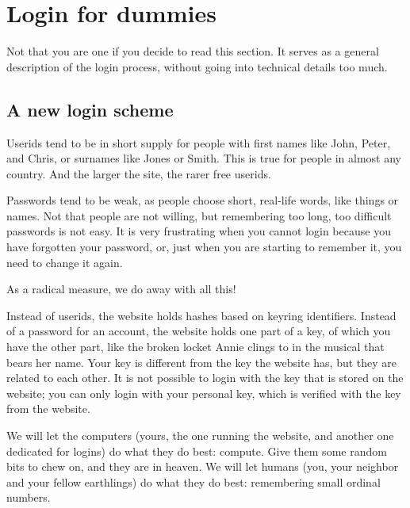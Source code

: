 \section{Login for dummies}
Not that you are one if you decide to read this section.
It serves as a general description of the login process,
without going into technical details too much.

\subsection{A new login scheme}
Userids tend to be in short supply for people with first names like John, Peter, and Chris,
or surnames like Jones or Smith.
This is true for people in almost any country.
And the larger the site, the rarer free userids.
\par
Passwords tend to be weak,
as people choose short, real-life words, like things or names.
Not that people are not willing, but remembering too long, too difficult passwords is not easy.
It is very frustrating when you cannot login because you have forgotten your password,
or,
just when you are starting to remember it,
you need to change it again.
\par
As a radical measure, we do away with all this!
\par
Instead of userids, the website holds hashes based on keyring identifiers.
Instead of a password for an account, the website holds one part of a key, of which you have the other part,
like the broken locket Annie clings to in the musical that bears her name.
Your key is different from the key the website has, but they are related to each other.
It is not possible to login with the key that is stored on the website;
you can only login with your personal key, which is verified with the key from the website.
\par
We will let the computers
(yours, the one running the website, and another one dedicated for logins)
do what they do best: compute.
Give them some random bits to chew on, and they are in heaven.
We will let humans (you, your neighbor and your fellow earthlings) do what they do best:
remembering small ordinal numbers.

